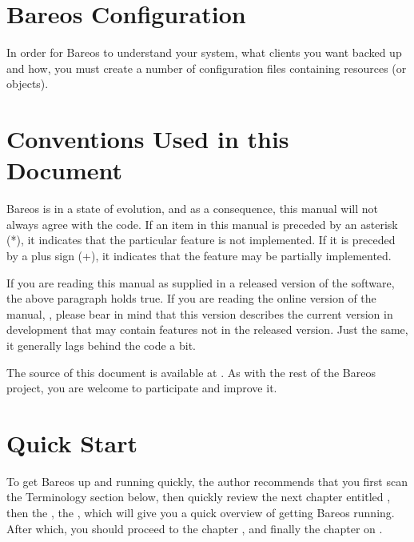 \section{Bareos Configuration}

In order for Bareos to understand your system, what clients you want backed
up and how, you must create a number of configuration files containing
resources (or objects).%


\section{Conventions Used in this Document}

Bareos is in a state of evolution, and as a consequence, this manual
will not always agree with the code. If an item in this manual is preceded by
an asterisk (*), it indicates that the particular feature is not implemented.
If it is preceded by a plus sign (+), it indicates that the feature may be
partially implemented.

If you are reading this manual as supplied in a released version of the
software, the above paragraph holds true. If you are reading the online
version of the manual,
, please bear in
mind that this version describes the current version in development
that may contain features not in the released version. Just the same, it
generally lags behind the code a bit.

The source of this document is available at . 
As with the rest of the Bareos project, you are welcome to participate and improve it.

\section{Quick Start}

To get Bareos up and running quickly, the author recommends
that you first scan the
Terminology section below, then quickly review the next chapter entitled
, then the
, 
the , which will
give you a quick overview of getting Bareos running. 
After which, you should
proceed to the chapter
, 
and finally the chapter on
.

